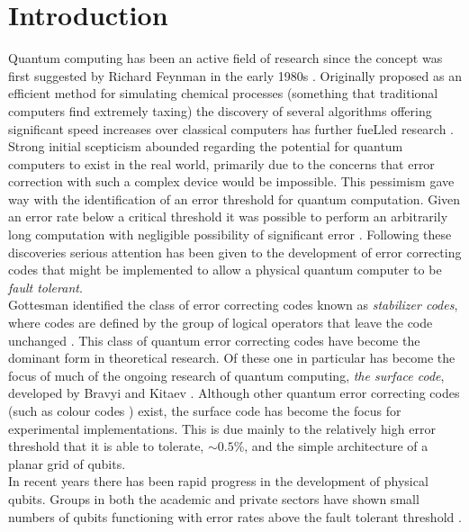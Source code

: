 
\chapter{Introduction}

Quantum computing has been an active field of research since the concept was first suggested by Richard Feynman in the early 1980s \cite{Feynman1982}. 
Originally proposed as an efficient method for simulating chemical processes (something that traditional computers find extremely taxing) the discovery of several algorithms offering significant speed increases over classical computers has further fueLled research \cite{Shor1994,Shor1997}.
Strong initial scepticism abounded regarding the potential for quantum computers to exist in the real world, primarily due to the concerns that error correction with such a complex device would be impossible\cite{Preskill1997}. 
This pessimism gave way with the identification of an error threshold for quantum computation. 
Given an error rate below a critical threshold it was possible to perform an arbitrarily long computation with negligible possibility of significant error \cite{Shor1996,Aharonov1997}.
Following these discoveries serious attention has been given to the development of error correcting codes that might be implemented to allow a physical quantum computer to be \emph{fault tolerant}. 
\\
Gottesman identified the class of error correcting codes known as \emph{stabilizer codes}, where codes are defined by the group of logical operators that leave the code unchanged \cite{Gottesman1997a}. 
This class of quantum error correcting codes have become the dominant form in theoretical research. 
Of these one in particular has become the focus of much of the ongoing research of quantum computing, \emph{the surface code}, developed by Bravyi and Kitaev \cite{Bravyi1998}. 
Although other quantum error correcting codes (such as colour codes \cite{Vasmer2018}) exist, the surface code has become the focus for experimental implementations. This is due mainly to the relatively high error threshold that it is able to tolerate, $\sim0.5\%$, and the simple architecture of a planar grid of qubits. 
\\
In recent years there has been rapid progress in the development of physical qubits. 
Groups in both the academic and private sectors have shown small numbers of qubits functioning with error rates above the fault tolerant threshold \cite{Barends2015,Reagor2017}.  
